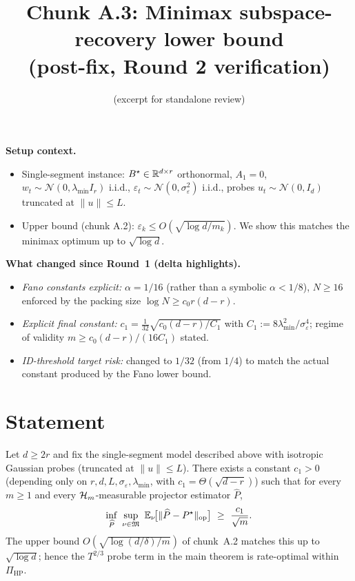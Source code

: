 

\title{Chunk A.3: Minimax subspace-recovery lower bound\\(post-fix, Round 2 verification)}
\author{(excerpt for standalone review)}
\date{}


\maketitle

\textbf{Setup context.}
\begin{itemize}[leftmargin=*,itemsep=1pt,topsep=1pt]
\item Single-segment instance: $B^\star\in\mathbb{R}^{d\times r}$ orthonormal,
$A_1=0$, $w_t\sim\mathcal N(0,\lambda_{\min}I_r)$ i.i.d.,
$\varepsilon_t\sim\mathcal N(0,\sigma_\varepsilon^2)$ i.i.d., probes
$u_t\sim\mathcal N(0,I_d)$ truncated at $\|u\|\le L$.
\item Upper bound (chunk A.2): $\varepsilon_k\le O(\sqrt{\log d/m_k})$.
We show this matches the minimax optimum up to $\sqrt{\log d}$.
\end{itemize}

\textbf{What changed since Round~1 (delta highlights).}
\begin{itemize}[leftmargin=*,itemsep=1pt,topsep=1pt]
\item \emph{Fano constants explicit:} $\alpha = 1/16$ (rather than a
symbolic $\alpha<1/8$), $N\ge 16$ enforced by the packing size
$\log N\ge c_0 r(d-r)$.
\item \emph{Explicit final constant:} $c_1 = \tfrac{1}{32}\sqrt{c_0(d-r)/C_1}$
with $C_1 := 8\lambda_{\min}^2/\sigma_\varepsilon^4$; regime of
validity $m\ge c_0(d-r)/(16 C_1)$ stated.
\item \emph{ID-threshold target risk:} changed to $1/32$ (from $1/4$)
to match the actual constant produced by the Fano lower bound.
\end{itemize}

\section*{Statement}

\begin{theorem}
\label{thm:minimax_recovery}
Let $d\ge 2r$ and fix the single-segment model described above with
isotropic Gaussian probes (truncated at $\|u\|\le L$). There exists a
constant $c_1>0$ (depending only on $r,d,L,\sigma_\varepsilon,\lambda_{\min}$,
with $c_1=\Theta(\sqrt{d-r})$) such that for every $m\ge 1$ and every
$\mathcal{H}_m$-measurable projector estimator $\widehat P$,
\[
\inf_{\widehat P}\ \sup_{\nu\in\mathfrak{M}}\ \E_\nu\!\bigl[\|\widehat P-P^\star\|_{\op}\bigr]
 \ \ge\ \frac{c_1}{\sqrt m}.
\]
The upper bound $O(\sqrt{\log(d/\delta)/m})$ of chunk~A.2 matches this
up to $\sqrt{\log d}$; hence the $T^{2/3}$ probe term in the main
theorem is rate-optimal within $\Pi_{\mathrm{HP}}$.
\end{theorem}

